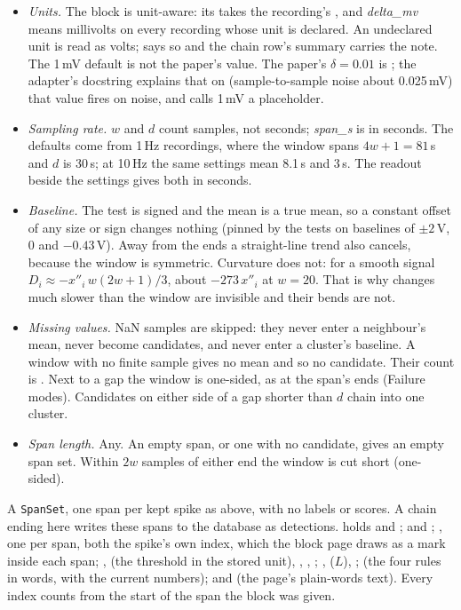 \begin{itemize}
\item \emph{Units.} The block is unit-aware: its  takes the recording's
  , and \emph{delta\_mv} means millivolts on every recording whose unit is
  declared. An undeclared unit is read as volts;  says so and the
  chain row's summary carries the note. The 1\,mV default is not the paper's value. The
  paper's $\delta = 0.01$ is ; the adapter's
  docstring explains that on  (sample-to-sample noise about
  0.025\,mV) that value fires on noise, and calls 1\,mV a placeholder.
\item \emph{Sampling rate.} $w$ and $d$ count samples, not seconds; \emph{span\_s} is in
  seconds. The defaults come from 1\,Hz recordings, where the window spans $4w+1 = 81$\,s and
  $d$ is 30\,s; at 10\,Hz the same settings mean 8.1\,s and 3\,s. The readout beside the
  settings gives both in seconds.
\item \emph{Baseline.} The test is signed and the mean is a true mean, so a constant offset
  of any size or sign changes nothing (pinned by the tests on baselines of $\pm 2$\,V, 0 and
  $-0.43$\,V). Away from the ends a straight-line trend also cancels, because the window is
  symmetric. Curvature does not: for a smooth signal $D_i \approx -x''_i\, w(2w+1)/3$, about
  $-273\,x''_i$ at $w = 20$. That is why changes much slower than the window are invisible
  and their bends are not.
\item \emph{Missing values.} NaN samples are skipped: they never enter a neighbour's mean,
  never become candidates, and never enter a cluster's baseline. A window with no finite
  sample gives no mean and so no candidate. Their count is . Next to a
  gap the window is one-sided, as at the span's ends (Failure modes). Candidates on either
  side of a gap shorter than $d$ chain into one cluster.
\item \emph{Span length.} Any. An empty span, or one with no candidate, gives an empty span
  set. Within $2w$ samples of either end the window is cut short (one-sided).
\end{itemize}

A \texttt{SpanSet}, one span per kept spike as above, with no labels or scores. A chain
ending here writes these spans to the database as detections.  holds
 and ;  and ; , one
 per span, both the spike's own index, which the block page
draws as a mark inside each span; ,  (the threshold in the
stored unit), , , ; ,
 ($L$), ;  (the four rules in words, with the
current numbers); and  (the page's plain-words text). Every index counts from
the start of the span the block was given.

